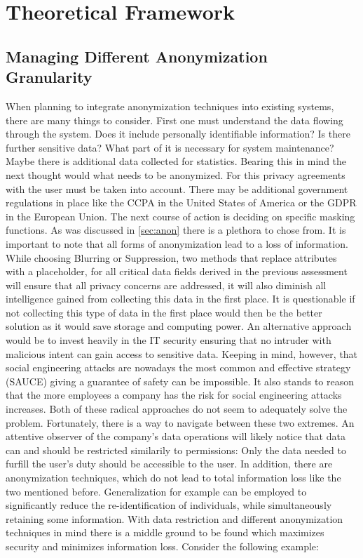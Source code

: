 \chapter{Theoretical Framework\label{cha:chapter3}}

\section{Managing Different Anonymization Granularity}
When planning to integrate anonymization techniques into existing systems, there are many things to consider. First one must understand the data flowing through the system.
Does it include personally identifiable information? Is there further sensitive data? What part of it is necessary for system maintenance? Maybe there is additional data collected for statistics.
Bearing this in mind the next thought would what needs to be anonymized. For this privacy agreements with the user must be taken into account. There may be additional government regulations in place like the \ac{CCPA} in the United States of America or the \ac{GDPR} in the European Union. 
The next course of action is deciding on specific masking functions. As was discussed in \ref{sec:anon} there is a plethora to chose from. It is important to note that all forms of anonymization lead to a loss of information. 
While choosing Blurring or Suppression, two methods that replace attributes with a placeholder, for all critical data fields derived in the previous assessment will ensure that all privacy concerns are addressed, it will also diminish all intelligence gained from collecting this data in the first place. It is questionable if not collecting this type of data in the first place would then be the better solution as it would save storage and computing power. 
An alternative approach would be to invest heavily in the IT security ensuring that no intruder with malicious intent can gain access to sensitive data. Keeping in mind, however, that social engineering attacks are nowadays the most common and effective strategy (SAUCE) giving a guarantee of safety can be impossible. It also stands to reason that the more employees a company has the risk for social
engineering attacks increases. Both of these radical approaches do not seem to adequately solve the problem. Fortunately, there is a way to navigate between these two extremes. An attentive observer of the company's data operations will likely notice that data can and should be restricted similarily to permissions: Only the data needed to furfill the user's duty should be accessible to the user. 
In addition, there are anonymization techniques, which do not lead to total information loss like the two mentioned before. Generalization for example can be employed to significantly reduce the re-identification of individuals, while simultaneously retaining some information.
With data restriction and different anonymization techniques in mind there is a middle ground to be found which maximizes security and minimizes information loss. Consider the following example:

